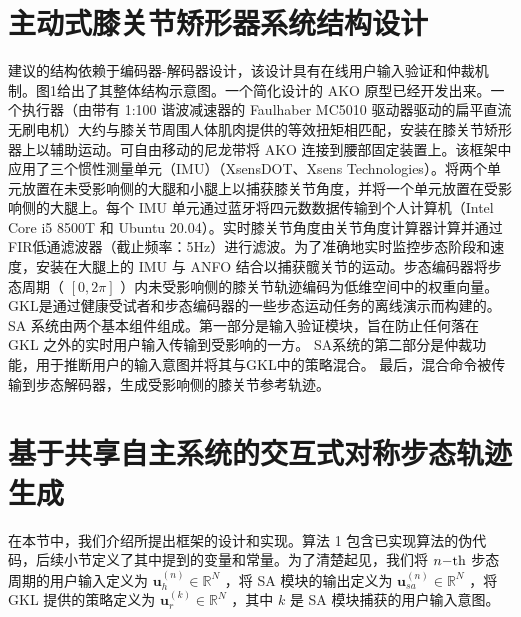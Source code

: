 \section{主动式膝关节矫形器系统结构设计}
建议的结构依赖于编码器-解码器设计，该设计具有在线用户输入验证和仲裁机制。图1给出了其整体结构示意图。一个简化设计的 AKO 原型已经开发出来。一个执行器（由带有 1:100 谐波减速器的 Faulhaber MC5010 驱动器驱动的扁平直流无刷电机）大约与膝关节周围人体肌肉提供的等效扭矩相匹配，安装在膝关节矫形器上以辅助运动。可自由移动的尼龙带将 AKO 连接到腰部固定装置上。该框架中应用了三个惯性测量单元（IMU）（XsensDOT、Xsens Technologies）。将两个单元放置在未受影响侧的大腿和小腿上以捕获膝关节角度，并将一个单元放置在受影响侧的大腿上。每个 IMU 单元通过蓝牙将四元数数据传输到个人计算机（Intel Core i5 8500T 和 Ubuntu 20.04）。实时膝关节角度由关节角度计算器计算并通过FIR低通滤波器（截止频率：5Hz）进行滤波。为了准确地实时监控步态阶段和速度，安装在大腿上的 IMU 与 ANFO 结合以捕获髋关节的运动。步态编码器将步态周期（    $[0,2\pi ]$    ）内未受影响侧的膝关节轨迹编码为低维空间中的权重向量。 GKL是通过健康受试者和步态编码器的一些步态运动任务的离线演示而构建的。 SA 系统由两个基本组件组成。第一部分是输入验证模块，旨在防止任何落在 GKL 之外的实时用户输入传输到受影响的一方。 SA系统的第二部分是仲裁功能，用于推断用户的输入意图并将其与GKL中的策略混合。
最后，混合命令被传输到步态解码器，生成受影响侧的膝关节参考轨迹。

\section{基于共享自主系统的交互式对称步态轨迹生成}
在本节中，我们介绍所提出框架的设计和实现。算法 1 包含已实现算法的伪代码，后续小节定义了其中提到的变量和常量。为了清楚起见，我们将    $n{\rm{ - th}}$    步态周期的用户输入定义为    ${\pmb{u}}_h^{(n)} \in {\mathbb{R}^N}$    ，将 SA 模块的输出定义为    ${\pmb{u}}_{sa}^{(n)} \in {\mathbb{R}^N}$    ，将 GKL 提供的策略定义为    ${\pmb{u}}_r^{(k)} \in {\mathbb{R}^N}$    ，其中    $k$    是 SA 模块捕获的用户输入意图。  


